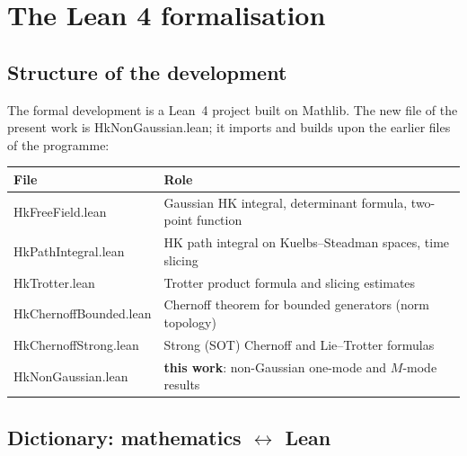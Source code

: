 \documentclass[11pt,a4paper]{article}
\theoremstyle{plain}
\theoremstyle{definition}
\theoremstyle{remark}
\let\leanoldunderscore\_
\newcommand{\leanbreakunderscore}{\leanoldunderscore\allowbreak}
\newcommand{\lean}[1]{{\ttfamily\hyphenchar\font=-1\relax
  \let\_\leanbreakunderscore #1}}
\begin{document}
\section{The Lean 4 formalisation}
\label{sec:lean}

\subsection{Structure of the development}

The formal development is a Lean~4 project built on Mathlib. The new file of the present
work is \lean{HkNonGaussian.lean}; it imports and builds upon the earlier files of the
programme:

\begin{center}
\begin{tabular}{@{}ll@{}}
\toprule
File & Role\\
\midrule
\lean{HkFreeField.lean} & Gaussian HK integral, determinant formula, two-point function\\
\lean{HkPathIntegral.lean} & HK path integral on Kuelbs--Steadman spaces, time slicing\\
\lean{HkTrotter.lean} & Trotter product formula and slicing estimates\\
\lean{HkChernoffBounded.lean} & Chernoff theorem for bounded generators (norm topology)\\
\lean{HkChernoffStrong.lean} & Strong (SOT) Chernoff and Lie--Trotter formulas\\
\lean{HkNonGaussian.lean} & \textbf{this work}: non-Gaussian one-mode and $M$-mode results\\
\bottomrule
\end{tabular}
\end{center}

\subsection{Dictionary: mathematics $\leftrightarrow$ Lean}
\end{document}
